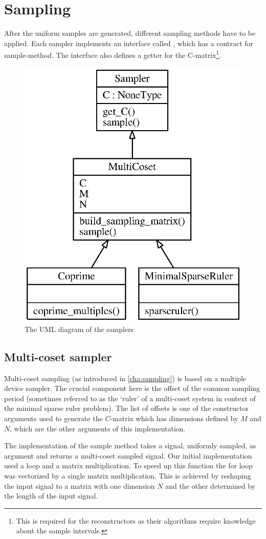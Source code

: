 \documentclass[a4paper, openany, oneside]{memoir}
\begin{document}
\section{Sampling}
\label{sec:sampling}
After the uniform samples are generated, different sampling methods have to be applied. Each sampler implements an interface called , which has a contract for sample-method. The interface also defines a getter for the C-matrix\footnote{This is required for the reconstructors as their algorithms require knowledge about the sample intervals.}.

\begin{figure}
    \centering
    \includegraphics[width=0.5\linewidth]{./figures/classes_sampling.eps}
    \caption{The UML diagram of the samplers}
    \label{fig:umlclasses}
\end{figure}

\subsection{Multi-coset sampler}
\label{sub:multi_coset_sampler}
Multi-coset sampling (as introduced in \cref{cha:sampling}) is based on a multiple device sampler. The crucial component here is the offset of the common sampling period (sometimes referred to as the `ruler' of a multi-coset system in context of the minimal sparse ruler problem). The list of offsets is one of the constructor arguments used to generate the $C$-matrix which has dimensions defined by $M$ and $N$, which are the other arguments of this implementation.

The implementation of the sample method takes a signal, uniformly sampled, as argument and returns a multi-coset sampled signal. Our initial implementation used a loop and a matrix multiplication. To speed up this function the for loop was vectorized by a single matrix multiplication. This is achieved by reshaping the input signal to a matrix with one dimension $N$ and the other determined by the length of the input signal.
\end{document}
